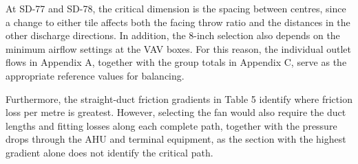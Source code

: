 At SD-77 and SD-78, the critical dimension is the spacing between centres, since a change to either tile affects both the facing throw ratio and the distances in the other discharge directions. In addition, the 8-inch selection also depends on the minimum airflow settings at the VAV boxes. For this reason, the individual outlet flows in Appendix A, together with the group totals in Appendix C, serve as the appropriate reference values for balancing.

Furthermore, the straight-duct friction gradients in Table 5 identify where friction loss per metre is greatest. However, selecting the fan would also require the duct lengths and fitting losses along each complete path, together with the pressure drops through the AHU and terminal equipment, as the section with the highest gradient alone does not identify the critical path.
